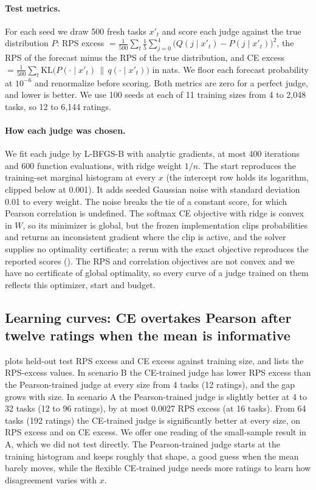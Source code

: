 \paragraph{Test metrics.}
For each seed we draw 500 fresh tasks $x'_t$ and score each judge against the true distribution $P$: RPS excess $=\frac1{500}\sum_t\frac15\sum_{j=0}^{4}\bigl(Q(j\mid x'_t)-P(j\mid x'_t)\bigr)^2$, the RPS of the forecast minus the RPS of the true distribution, and CE excess $=\frac1{500}\sum_t\mathrm{KL}\bigl(P(\cdot\mid x'_t)\,\|\,q(\cdot\mid x'_t)\bigr)$ in nats.
We floor each forecast probability at $10^{-6}$ and renormalize before scoring.
Both metrics are zero for a perfect judge, and lower is better.
We use 100 seeds at each of 11 training sizes from 4 to 2{,}048 tasks, so 12 to 6{,}144 ratings.

\paragraph{How each judge was chosen.}
We fit each judge by L-BFGS-B with analytic gradients, at most 400 iterations and 600 function evaluations, with ridge weight $1/n$.
The start reproduces the training-set marginal histogram at every $x$ (the intercept row holds its logarithm, clipped below at 0.001). It adds seeded Gaussian noise with standard deviation 0.01 to every weight. The noise breaks the tie of a constant score, for which Pearson correlation is undefined.
The softmax CE objective with ridge is convex in $W$, so its minimizer is global, but the frozen implementation clips probabilities and returns an inconsistent gradient where the clip is active, and the solver supplies no optimality certificate; a rerun with the exact objective reproduces the reported scores ().
The RPS and correlation objectives are not convex and we have no certificate of global optimality, so every curve of a judge trained on them reflects this optimizer, start and budget.

\subsection{Learning curves: CE overtakes Pearson after twelve ratings when the mean is informative}
\label{app:controlled-curves}

 plots held-out test RPS excess and CE excess against training size, and  lists the RPS-excess values.
In scenario B the CE-trained judge has lower RPS excess than the Pearson-trained judge at every size from 4 tasks (12 ratings), and the gap grows with size.
In scenario A the Pearson-trained judge is slightly better at 4 to 32 tasks (12 to 96 ratings), by at most 0.0027 RPS excess (at 16 tasks).
From 64 tasks (192 ratings) the CE-trained judge is significantly better at every size, on RPS excess and on CE excess.
We offer one reading of the small-sample result in A, which we did not test directly.
The Pearson-trained judge starts at the training histogram and keeps roughly that shape, a good guess when the mean barely moves, while the flexible CE-trained judge needs more ratings to learn how disagreement varies with $x$.

